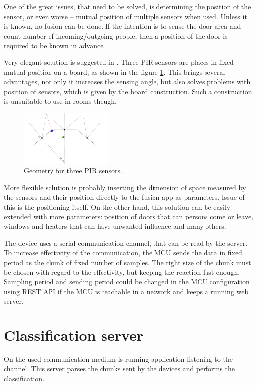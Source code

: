 One of the great issues, that need to be solved, is determining the position of the sensor,
or even worse -- mutual position of multiple sensors when used. Unless it is
known, no fusion can be done. If the intention is to sense the door area and count
number of incoming/outgoing people, then a position of the door is required to be known
in advance.

Very elegant solution is suggested in \cite{GestureControl}. Three PIR sensors are
places in fixed mutual position on a board, as shown in the figure \ref{fig:3pir_geometry}.
This brings several advantages, not only it increases the sensing angle,
but also solves problems with position of sensors, which is given by the board construction.
Such a construction is unsuitable to use in rooms though.

\begin{figure}[h!]
\begin{center}
\includegraphics[width=0.4\textwidth]{img/3pir_geometry.png}
\caption{Geometry for three PIR sensors.\label{fig:3pir_geometry}}
\end{center}
\end{figure}

More flexible solution is probably inserting the dimension of space measured by the sensors
and their position directly to the fusion app as parameters. Issue of this is the positioning
itself. On the other hand, this solution can be easily extended with more parameters:
position of doors that can persons come or leave, windows and heaters that can have
unwanted influence and many others.

The device uses a serial communication channel, that can be read by the server. To
increase effectivity of the communication, the MCU sends the data in fixed period
as the chunk of fixed number of samples. The right size of the chunk must be chosen
with regard to the effectivity, but keeping the reaction fast enough. Sampling period and
sending period could be changed in the MCU configuration using REST API if the MCU
is reachable in a network and keeps a running web server.


\section{Classification server}
\label{section:classification}
On the used communication medium is running application listening to the channel.
This server parses the chunks sent by the devices and performs the classification.


